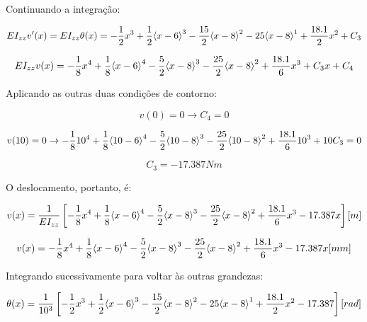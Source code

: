         Continuando a integração:

        \begin{equation*}
            EI_{zz}v'(x) = EI_{zz}\theta(x)= -\frac{1}{2}x^3 + \frac{1}{2}{\left\langle x-6\right\rangle^{3}} - \frac{15}{2}{\left\langle x-8\right\rangle^{2}} - 25{\left\langle x-8\right\rangle^{1}} + \frac{18.1}{2} x^2 + C_3
        \end{equation*}

        \begin{equation*}
            EI_{zz}v(x) = -\frac{1}{8}x^4 + \frac{1}{8}{\left\langle x-6\right\rangle^{4}} - \frac{5}{2}{\left\langle x-8\right\rangle^{3}} - \frac{25}{2}{\left\langle x-8\right\rangle^{2}} + \frac{18.1}{6} x^3 + C_3 x + C_4
        \end{equation*}

        Aplicando as outras duas condições de contorno:

        \begin{equation*}
            v(0) = 0 \rightarrow C_4 = 0
        \end{equation*}

        \begin{equation*}
            v(10) = 0 \rightarrow -\frac{1}{8}10^4 + \frac{1}{8}{\left\langle 10-6\right\rangle^{4}} - \frac{5}{2}{\left\langle 10-8\right\rangle^{3}} - \frac{25}{2}{\left\langle 10-8\right\rangle^{2}} + \frac{18.1}{6} 10^3 + 10C_3 = 0
        \end{equation*}

        \begin{equation*}
            C_3 = -17.387 Nm
        \end{equation*}

        O deslocamento, portanto, é:

        \begin{equation*}
            v(x) = \frac{1}{EI_{zz}}\left[-\frac{1}{8}x^4 + \frac{1}{8}{\left\langle x-6\right\rangle^{4}} - \frac{5}{2}{\left\langle x-8\right\rangle^{3}} - \frac{25}{2}{\left\langle x-8\right\rangle^{2}} + \frac{18.1}{6} x^3 - 17.387 x \right] [m]
        \end{equation*}

        \begin{equation*}
            v(x) = -\frac{1}{8}x^4 + \frac{1}{8}{\left\langle x-6\right\rangle^{4}} - \frac{5}{2}{\left\langle x-8\right\rangle^{3}} - \frac{25}{2}{\left\langle x-8\right\rangle^{2}} + \frac{18.1}{6} x^3 - 17.387 x [mm]
        \end{equation*}


        Integrando sucessivamente para voltar às outras grandezas:

        \begin{equation*}
            \theta(x) = \frac{1}{10^3}\left[-\frac{1}{2}x^3 + \frac{1}{2}{\left\langle x-6\right\rangle^{3}} - \frac{15}{2}{\left\langle x-8\right\rangle^{2}} - 25{\left\langle x-8\right\rangle^{1}} + \frac{18.1}{2} x^2 - 17.387\right] [rad]
        \end{equation*}

